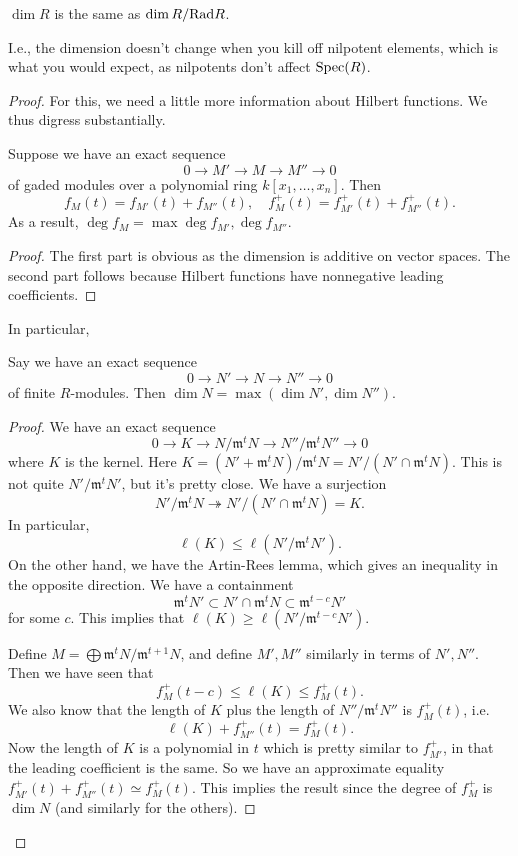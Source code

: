 \begin{proposition} 
$\dim R$ is the same as $\dim R/\mathrm{Rad} R$.
\end{proposition} 
I.e., the dimension doesn't change when you kill off nilpotent elements, which
is what you would expect, as nilpotents don't affect $\mathrm{Spec} (R)$.
\begin{proof} 
For this, we need a little more information about Hilbert functions.
We thus digress substantially. 

\begin{proposition} 
Suppose we have an exact sequence
\[ 0 \to M' \to M \to M'' \to 0 \]
of gaded modules over a polynomial ring $k[x_1, \dots, x_n]$.	Then
\[ f_M(t) = f_{M'}(t) + f_{M''}(t), \quad  f_M^+(t) = f_{M'}^+(t) +
f_{M''}^+(t). \]
As a result, $\deg f_M = \max \deg f_{M'}, \deg f_{M''}$.
\end{proposition} 
\begin{proof} The first part is obvious as the dimension is additive on vector
spaces. The second part follows because Hilbert functions have nonnegative
leading coefficients.
\end{proof} 
In particular, 
\begin{corollary} 
Say we have an exact sequence
\[ 0 \to N' \to N \to N'' \to 0  \]
of finite $R$-modules. Then $\dim N = \max (\dim N', \dim N'')$.
\end{corollary} 
\begin{proof} 
We have an exact sequence
\[ 0 \to K \to N/\mathfrak{m}^t N \to N''/\mathfrak{m}^t N'' \to 0  \]
where $K$ is the kernel. Here $K = (N' + \mathfrak{m}^t N)/ \mathfrak{m}^t N
= N'/( N' \cap \mathfrak{m}^t N)$. This is not quite $N'/\mathfrak{m}^t N'$,
but it's pretty close. 
We have a surjection
\[ N'/\mathfrak{m}^t N \twoheadrightarrow N'/(N' \cap \mathfrak{m}^t N) = K. \]
In particular, 
\[ \ell(K) \leq \ell(N'/\mathfrak{m}^t N').  \]
On the other hand, we have the Artin-Rees lemma, which gives an inequality in
the opposite direction. We have a containment
\[ \mathfrak{m}^t N' \subset N' \cap \mathfrak{m}^t N \subset
\mathfrak{m}^{t-c} N'  \]
for some $c$. This implies that $\ell(K) \geq \ell( N'/\mathfrak{m}^{t-c} N')$. 

Define $M = \bigoplus \mathfrak{m}^t N/\mathfrak{m}^{t+1} N$, and define $M',
M''$ similarly in terms of $N', N''$. Then we have seen that 
\[ \boxed{f_M^+(t-c) \leq \ell(K) \leq f_M^+(t).}  \]
We also know that the length of $K$ plus the length of $N''/\mathfrak{m}^t N''$
is $f_M^+(t)$, i.e.
\[ \ell(K) + f_{M''}^+(t) = f_M^+(t).  \]
Now the length of $K$ is a polynomial in $t$ which is pretty similar to
$f_{M'}^+$, in that the leading coefficient is the same. So we have an
approximate equality $f_{M'}^+(t) + f_{M''}^+(t) \simeq f_M^+(t)$. This implies the
result since the degree of $f_M^+$ is $\dim N$ (and similarly for the others). 
\end{proof} 


\end{proof}
